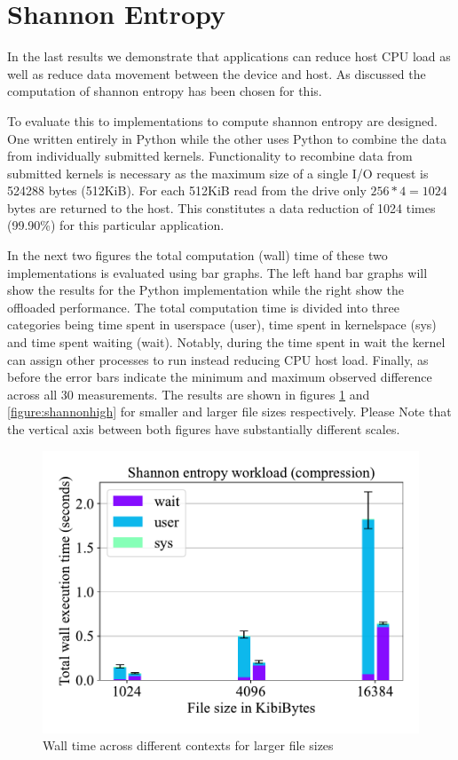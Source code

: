\section{Shannon Entropy}

In the last results we demonstrate that applications can reduce host CPU load
as well as reduce data movement between the device and host. As discussed the
computation of shannon entropy has been chosen for this.

To evaluate this to implementations to compute shannon entropy are designed.
One written entirely in Python while the other uses Python to combine the
data from individually submitted kernels. Functionality to recombine data from
submitted kernels is necessary as the maximum size of a single I/O request is
524288 bytes (512KiB). For each 512KiB read from the drive only
$256 * 4=1024$ bytes are returned to the host. This constitutes a data reduction
of 1024 times (99.90\%) for this particular application.

In the next two figures the total computation (wall) time of these two
implementations is evaluated using bar graphs. The left hand bar graphs will show
the results for the Python implementation while the right show the offloaded
performance. The total computation time is divided into three categories being
time spent in userspace (user), time spent in kernelspace (sys) and time spent
waiting (wait). Notably, during the time spent in wait the kernel can assign
other processes to run instead reducing CPU host load. Finally, as before the
error bars indicate the minimum and maximum observed difference across all 30
measurements. The results are shown in figures \ref{figure:shannonlow} and
\ref{figure:shannonhigh} for smaller and larger file sizes respectively. Please
Note that the vertical axis between both figures have substantially different
scales.

\begin{figure}[h]
    \centering
	\includegraphics[width=1\textwidth]{resources/images/results-shannon-lower.pdf}
	\caption{Wall time across different contexts for larger file sizes}
    \label{figure:shannonlow}
\end{figure}

